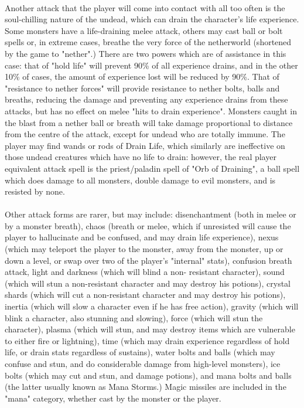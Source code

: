 \paragraph{}Another attack that the player will come into contact with all too often
is the soul-chilling nature of the undead, which can drain the character's
life experience. Some monsters have a life-draining melee attack, others may
cast ball or bolt spells or, in extreme cases, breathe the very force of the
netherworld (shortened by the game to "nether".) There are two powers which
are of assistance in this case: that of "hold life" will prevent 90\% of all
experience drains, and in the other 10\% of cases, the amount of experience
lost will be reduced by 90\%. That of "resistance to nether forces" will
provide resistance to nether bolts, balls and breaths, reducing the damage
and preventing any experience drains from these attacks, but has no effect
on melee "hits to drain experience". Monsters caught in the blast from a
nether ball or breath will take damage proportional to distance from the
centre of the attack, except for undead who are totally immune. The player
may find wands or rods of Drain Life, which similarly are ineffective on
those undead creatures which have no life to drain: however, the real
player equivalent attack spell is the priest/paladin spell of "Orb of
Draining", a ball spell which does damage to all monsters, double damage to
evil monsters, and is resisted by none.

\paragraph{}Other attack forms are rarer, but may include: disenchantment (both in melee
or by a monster breath), chaos (breath or melee, which if unresisted
will cause the player to hallucinate and be confused, and may drain life
experience), nexus (which may teleport the player to the monster, away from
the monster, up or down a level, or swap over two of the player's "internal"
stats), confusion breath attack, light and darkness (which will blind a non-
resistant character), sound (which will stun a non-resistant character and
may destroy his potions), crystal shards (which will cut a non-resistant
character and may destroy his potions), inertia (which will slow a character
even if he has free action), gravity (which will blink a character, also
stunning and slowing), force (which will stun the character), plasma (which
will stun, and may destroy items which are vulnerable to either fire or
lightning), time (which may drain experience regardless of hold life, or
drain stats regardless of sustains), water bolts and balls (which may confuse
and stun, and do considerable damage from high-level monsters), ice bolts
(which may cut and stun, and damage potions), and mana bolts and balls (the
latter usually known as Mana Storms.) Magic missiles are included in the
"mana" category, whether cast by the monster or the player.

